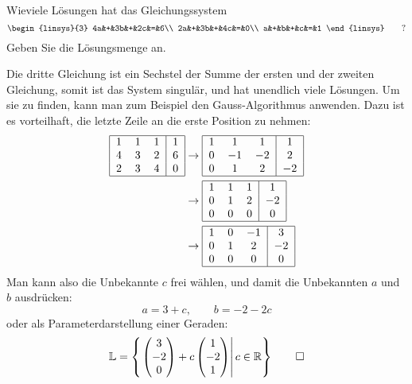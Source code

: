 Wieviele Lösungen hat das Gleichungssystem
\[
\begin{linsys}{3}
4a&+&3b&+&2c&=&6\\
2a&+&3b&+&4c&=&0\\
a&+&b&+&c&=&1
\end{linsys}
\qquad
?
\]
Geben Sie die Lösungsmenge an.

\begin{loesung}
Die dritte Gleichung ist ein Sechstel der Summe der ersten und der
zweiten Gleichung, somit ist das System singulär, und hat unendlich
viele Lösungen. Um sie zu finden, kann man zum Beispiel den Gauss-Algorithmus
anwenden. Dazu ist es vorteilhaft, die letzte Zeile an die erste
Position zu nehmen:
\begin{align*}
\begin{tabular}{|ccc|c|}
\hline
1&1&1&1\\
4&3&2&6\\
2&3&4&0\\
\hline
\end{tabular}
&
\rightarrow
\begin{tabular}{|ccc|c|}
\hline
1&1&1&1\\
0&$-1$&$-2$&2\\
0&1&2&$-2$\\
\hline
\end{tabular}
\\
&
\rightarrow
\begin{tabular}{|ccc|c|}
\hline
1&1&1&1\\
0&1&2&$-2$\\
0&0&0&0\\
\hline
\end{tabular}
\\
&
\rightarrow
\begin{tabular}{|ccc|c|}
\hline
1&0&$-1$&3\\
0&1&2&$-2$\\
0&0&0&0\\
\hline
\end{tabular}
\end{align*}
Man kann also die Unbekannte $c$ frei wählen, und damit die Unbekannten
$a$ und $b$ ausdrücken:
\[
a=3+c,\qquad b=-2-2c
\]
oder als Parameterdarstellung einer Geraden:
\[
\mathbb L =\left\{\left.
\begin{pmatrix}
3\\-2\\0
\end{pmatrix}
+c\begin{pmatrix}
1\\-2\\1
\end{pmatrix}\right | c\in \mathbb R
\right\}
\qedhere
\]
\end{loesung}

